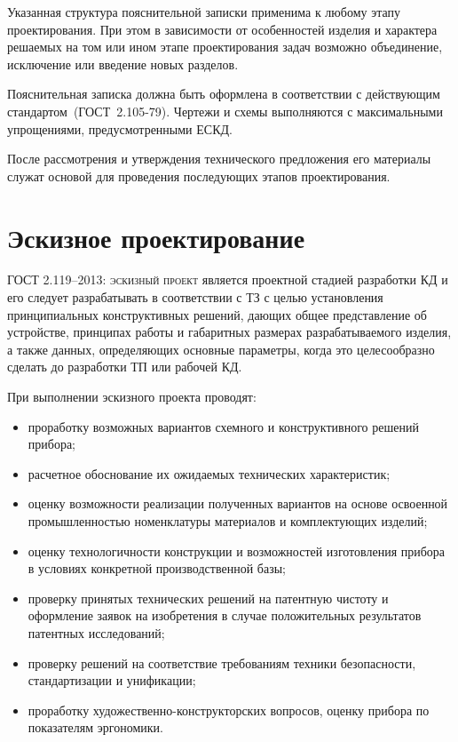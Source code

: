 Указанная структура пояснительной записки применима к любому этапу проектирования. При этом в зависимости от особенностей изделия и характера решаемых на том или ином этапе проектирования задач возможно объединение, исключение или введение новых разделов.

Пояснительная записка должна быть оформлена в соответствии с действующим стандартом~(ГОСТ~2.105-79). Чертежи и схемы выполняются с максимальными упрощениями, предусмотренными ЕСКД.

После рассмотрения и утверждения технического предложения его материалы служат основой для проведения последующих этапов проектирования.

\section{Эскизное проектирование}

\noindent
ГОСТ 2.119–2013: \textsc{эскизный проект} является проектной стадией разработки КД и его следует разрабатывать в соответствии с ТЗ с целью установления принципиальных конструктивных решений, дающих общее представление об устройстве, принципах работы и габаритных размерах разрабатываемого изделия, а также данных, определяющих основные параметры, когда это целесообразно сделать до разработки ТП или рабочей КД.

При выполнении эскизного проекта проводят:
\begin{itemize}
	\item проработку возможных вариантов схемного и конструктивного решений прибора;
	\item расчетное обоснование их ожидаемых технических характеристик;
	\item оценку возможности реализации полученных вариантов на основе освоенной промышленностью номенклатуры материалов и комплектующих изделий;
	\item оценку технологичности конструкции и возможностей изготовления прибора в условиях конкретной производственной базы;
	\item проверку принятых технических решений на патентную чистоту и оформление заявок на изобретения в случае положительных результатов патентных исследований;
	\item проверку решений на соответствие требованиям техники безопасности, стандартизации и унификации;
	\item проработку художественно-конструкторских вопросов, оценку прибора по показателям эргономики.
\end{itemize}


